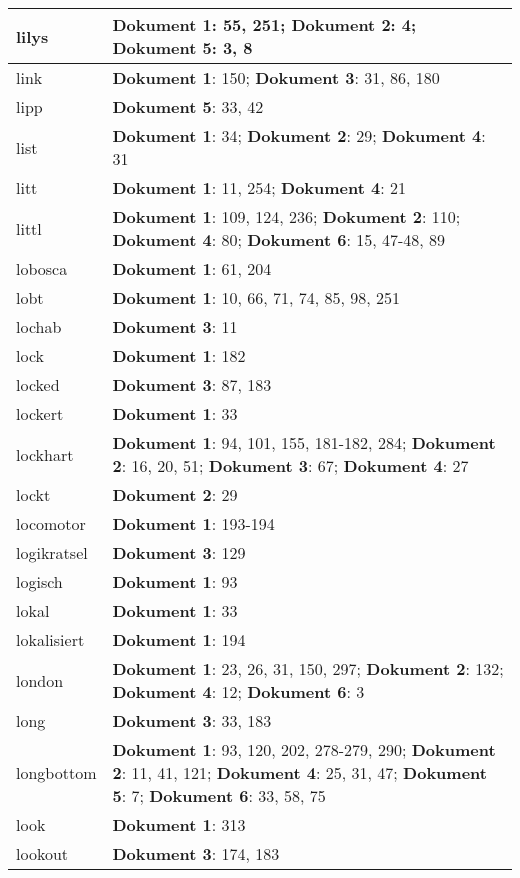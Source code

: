 \documentclass[a5paper]{article}
\begin{document}
\begin{longtable}[l]{|l|p{3in}|}
\hline
lilys & \textbf{Dokument 1}: 55, 251; \textbf{Dokument 2}: 4; \textbf{Dokument 5}: 3, 8 \\
\hline
link & \textbf{Dokument 1}: 150; \textbf{Dokument 3}: 31, 86, 180 \\
\hline
lipp & \textbf{Dokument 5}: 33, 42 \\
\hline
list & \textbf{Dokument 1}: 34; \textbf{Dokument 2}: 29; \textbf{Dokument 4}: 31 \\
\hline
litt & \textbf{Dokument 1}: 11, 254; \textbf{Dokument 4}: 21 \\
\hline
littl & \textbf{Dokument 1}: 109, 124, 236; \textbf{Dokument 2}: 110; \textbf{Dokument 4}: 80; \textbf{Dokument 6}: 15, 47-48, 89 \\
\hline
lobosca & \textbf{Dokument 1}: 61, 204 \\
\hline
lobt & \textbf{Dokument 1}: 10, 66, 71, 74, 85, 98, 251 \\
\hline
lochab & \textbf{Dokument 3}: 11 \\
\hline
lock & \textbf{Dokument 1}: 182 \\
\hline
locked & \textbf{Dokument 3}: 87, 183 \\
\hline
lockert & \textbf{Dokument 1}: 33 \\
\hline
lockhart & \textbf{Dokument 1}: 94, 101, 155, 181-182, 284; \textbf{Dokument 2}: 16, 20, 51; \textbf{Dokument 3}: 67; \textbf{Dokument 4}: 27 \\
\hline
lockt & \textbf{Dokument 2}: 29 \\
\hline
locomotor & \textbf{Dokument 1}: 193-194 \\
\hline
logikratsel & \textbf{Dokument 3}: 129 \\
\hline
logisch & \textbf{Dokument 1}: 93 \\
\hline
lokal & \textbf{Dokument 1}: 33 \\
\hline
lokalisiert & \textbf{Dokument 1}: 194 \\
\hline
london & \textbf{Dokument 1}: 23, 26, 31, 150, 297; \textbf{Dokument 2}: 132; \textbf{Dokument 4}: 12; \textbf{Dokument 6}: 3 \\
\hline
long & \textbf{Dokument 3}: 33, 183 \\
\hline
longbottom & \textbf{Dokument 1}: 93, 120, 202, 278-279, 290; \textbf{Dokument 2}: 11, 41, 121; \textbf{Dokument 4}: 25, 31, 47; \textbf{Dokument 5}: 7; \textbf{Dokument 6}: 33, 58, 75 \\
\hline
look & \textbf{Dokument 1}: 313 \\
\hline
lookout & \textbf{Dokument 3}: 174, 183 \\

\end{longtable}
\end{document}
